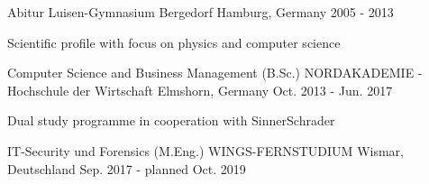 

\begin{cventries}

  \cventry
    {Abitur} %
    {Luisen-Gymnasium Bergedorf} %
    {Hamburg, Germany} %
    {2005 - 2013} %
    {
      \begin{cvitems} %
        \item {Scientific profile with focus on physics and computer science}
      \end{cvitems}
    }

  \cventry
    {Computer Science and Business Management (B.Sc.)} %
    {NORDAKADEMIE - Hochschule der Wirtschaft} %
    {Elmshorn, Germany} %
    {Oct. 2013 - Jun. 2017} %
    {
      \begin{cvitems} %
        \item {Dual study programme in cooperation with SinnerSchrader}
      \end{cvitems}
    }

  \cventry
    {IT-Security und Forensics (M.Eng.)} %
    {WINGS-FERNSTUDIUM} %
    {Wismar, Deutschland} %
    {Sep. 2017 - planned Oct. 2019} %
    {}

\end{cventries}
